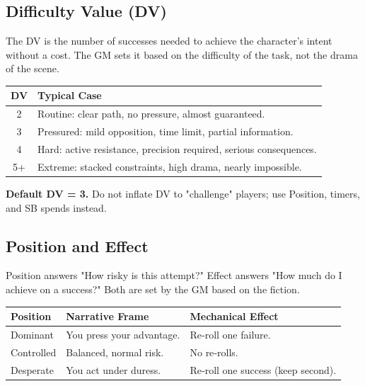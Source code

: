 \subsection{Difficulty Value (DV)}\label{subsec:difficulty_value}

The DV is the number of successes needed to achieve the character's intent
without a cost. The GM sets it based on the difficulty of the task, not the
drama of the scene.

\begin{tcolorbox}[title=Default DV Ladder, colback=white!97!gray, colframe=black!80!gray, sharp corners,breakable]
\begin{center}
\begin{tabular}{c p{3.5in}}
\toprule
\textbf{DV} & \textbf{Typical Case} \\
\midrule
2 & Routine: clear path, no pressure, almost guaranteed. \\
3 & Pressured: mild opposition, time limit, partial information. \\
4 & Hard: active resistance, precision required, serious consequences. \\
5+ & Extreme: stacked constraints, high drama, nearly impossible. \\
\bottomrule
\end{tabular}
\end{center}
\end{tcolorbox}

\noindent \textbf{Default DV = 3.} Do not inflate DV to "challenge" players; use
Position, timers, and SB spends instead.

\subsection{Position and Effect}\label{subsec:position_effect}

Position answers "How risky is this attempt?" Effect answers "How much do I
achieve on a success?" Both are set by the GM based on the fiction.

\begin{center}
\begin{tabular}{lll}
\toprule
\textbf{Position} & \textbf{Narrative Frame} & \textbf{Mechanical Effect} \\
\midrule
Dominant   & You press your advantage. & Re‑roll one failure. \\
Controlled & Balanced, normal risk.   & No re‑rolls. \\
Desperate  & You act under duress.    & Re‑roll one success (keep second). \\
\bottomrule
\end{tabular}
\end{center}

